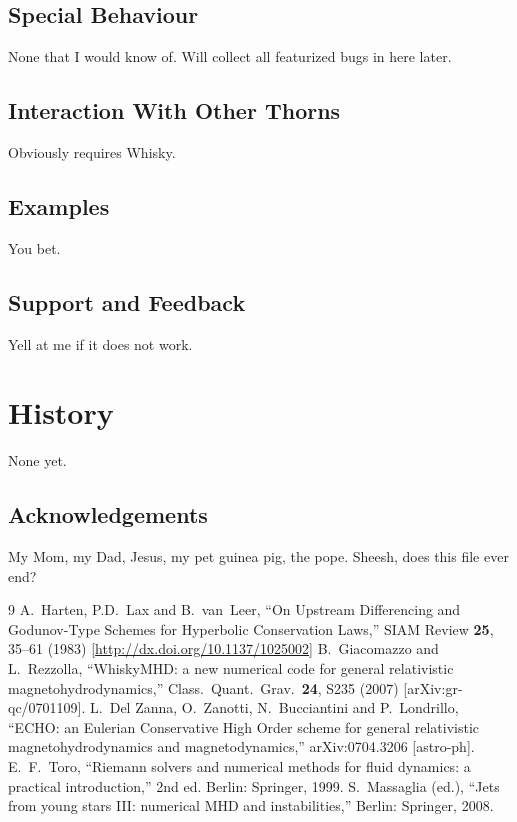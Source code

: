 \subsection{Special Behaviour}
None that I would know of. Will collect all featurized bugs in here later.

\subsection{Interaction With Other Thorns}
Obviously requires Whisky.

\subsection{Examples}
You bet.

\subsection{Support and Feedback}
Yell at me if it does not work.

\section{History}
None yet.

\subsection{Acknowledgements}
My Mom, my Dad, Jesus, my pet guinea pig, the pope. Sheesh, does this file
ever end?


\begin{thebibliography}{9}
 A.~Harten, P.D.~Lax and B.~van~Leer,
  ``On Upstream Differencing and Godunov-Type Schemes for Hyperbolic
  Conservation Laws,''
  SIAM Review {\bf 25}, 35--61 (1983)
  [\url{http://dx.doi.org/10.1137/1025002}]
 B.~Giacomazzo and L.~Rezzolla,
  ``WhiskyMHD: a new numerical code for general relativistic
  magnetohydrodynamics,''
  Class.\ Quant.\ Grav.\  {\bf 24}, S235 (2007)
  [arXiv:gr-qc/0701109].
 L.~Del Zanna, O.~Zanotti, N.~Bucciantini and P.~Londrillo,
  ``ECHO: an Eulerian Conservative High Order scheme for general relativistic
  magnetohydrodynamics and magnetodynamics,''
  arXiv:0704.3206 [astro-ph].
 E.~F.~Toro, 
    ``Riemann solvers and numerical methods for fluid dynamics: a practical
    introduction,''
    2nd ed. Berlin: Springer, 1999. 
 S.~Massaglia (ed.),
    ``Jets from young stars III: numerical MHD and instabilities,''
    Berlin: Springer, 2008. 




\end{thebibliography}



